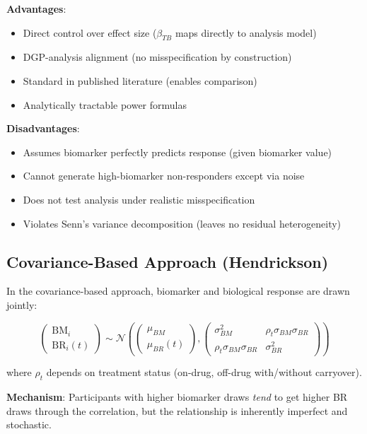 \documentclass[12pt,a4paper]{article}
\begin{document}
\textbf{Advantages}:
\begin{itemize}
\item Direct control over effect size ($\beta_{TB}$ maps directly to analysis model)
\item DGP-analysis alignment (no misspecification by construction)
\item Standard in published literature (enables comparison)
\item Analytically tractable power formulas
\end{itemize}

\textbf{Disadvantages}:
\begin{itemize}
\item Assumes biomarker perfectly predicts response (given biomarker value)
\item Cannot generate high-biomarker non-responders except via noise
\item Does not test analysis under realistic misspecification
\item Violates Senn's variance decomposition (leaves no residual heterogeneity)
\end{itemize}

\subsection{Covariance-Based Approach (Hendrickson)}

In the covariance-based approach, biomarker and biological response are drawn jointly:

\begin{equation}
\begin{pmatrix} \text{BM}_i \\ \text{BR}_{i}(t) \end{pmatrix} \sim \mathcal{N}\left(
\begin{pmatrix} \mu_{BM} \\ \mu_{BR}(t) \end{pmatrix},
\begin{pmatrix} \sigma^2_{BM} & \rho_{t} \sigma_{BM} \sigma_{BR} \\
\rho_{t} \sigma_{BM} \sigma_{BR} & \sigma^2_{BR} \end{pmatrix}
\right)
\end{equation}

where $\rho_t$ depends on treatment status (on-drug, off-drug with/without carryover).

\textbf{Mechanism}: Participants with higher biomarker draws \textit{tend} to get higher BR draws through the correlation, but the relationship is inherently imperfect and stochastic.
\end{document}

